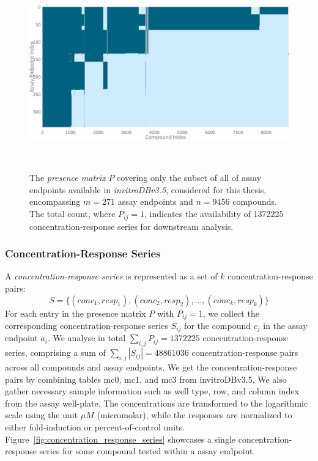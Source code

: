 \begin{figure}[h]  %
    \centering
    \includegraphics[width=1.0\textwidth]{figures/presence_matrix_subset.png}  
    \caption{The \emph{presence matrix} $P$ covering only the subset of all of assay endpoints available in \textit{invitroDBv3.5}, considered for this thesis, encompassing $m = \num{271}$ assay endpoints and $n = \num{9456}$ compounds. The total count, where $P_{ij} = 1$, indicates the availability of \num{1372225} concentration-response series for downstream analysis.}
~\label{fig:presence_matrix_subset} 
\end{figure}


\subsubsection{Concentration-Response Series}
A \textit{concentration-response series} is represented as a set of $k$ concentration-response pairs: 
\[ S = \{(conc_1, resp_1), (conc_2, resp_2), \dots, (conc_k, resp_k)\} \]
For each entry in the presence matrix $P$ with $P_{ij} = 1$, we collect the corresponding concentration-response series $S_{ij}$ for the compound $c_j$ in the assay endpoint $a_i$. We analyse in total $\sum_{i,j} P_{ij} = \num{1372225}$ concentration-response series, comprising a sum of $\sum_{i,j} |S_{ij}| = \num{48861036}$ concentration-response pairs across all compounds and assay endpoints.
We get the concentration-response pairs by combining tables mc0, mc1, and mc3 from invitroDBv3.5. We also gather necessary sample information such as well type, row, and column index from the assay well-plate.
The concentrations are transformed to the logarithmic scale using the unit $\mu M$ (micromolar), while the responses are normalized to either fold-induction or percent-of-control units.
Figure~\ref{fig:concentration_response_series} showcases a single concentration-response series for some compound tested within a assay endpoint.

